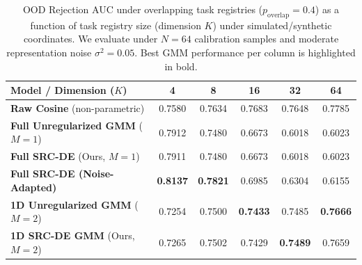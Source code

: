 \begin{table}[t]
\caption{OOD Rejection AUC under overlapping task registries ($p_{\text{overlap}} = 0.4$) as a function of task registry size (dimension $K$) under simulated/synthetic coordinates. We evaluate under $N=64$ calibration samples and moderate representation noise $\sigma^2=0.05$. Best GMM performance per column is highlighted in bold.}
\label{submission:tab:overlap_results}
\vskip 0.15in
\begin{center}
\begin{small}
\begin{tabular}{lccccc}
\toprule
{\bf Model / Dimension ($K$)} & {\bf 4} & {\bf 8} & {\bf 16} & {\bf 32} & {\bf 64} \\
\midrule
{\bf Raw Cosine} (non-parametric) & 0.7580 & 0.7634 & 0.7683 & 0.7648 & 0.7785 \\
\midrule
{\bf Full Unregularized GMM} ($M=1$)  & 0.7912 & 0.7480 & 0.6673 & 0.6018 & 0.6023 \\
{\bf Full SRC-DE} (Ours, $M=1$)       & 0.7911 & 0.7480 & 0.6673 & 0.6018 & 0.6023 \\
{\bf Full SRC-DE (Noise-Adapted)}     & \bf 0.8137 & \bf 0.7821 & 0.6985 & 0.6304 & 0.6155 \\
\midrule
{\bf 1D Unregularized GMM} ($M=2$)    & 0.7254 & 0.7500 & \bf 0.7433 & 0.7485 & \bf 0.7666 \\
{\bf 1D SRC-DE GMM} (Ours, $M=2$)    & 0.7265 & 0.7502 & 0.7429 & \bf 0.7489 & 0.7659 \\
\bottomrule
\end{tabular}
\end{small}
\end{center}
\vskip -0.1in
\end{table}

